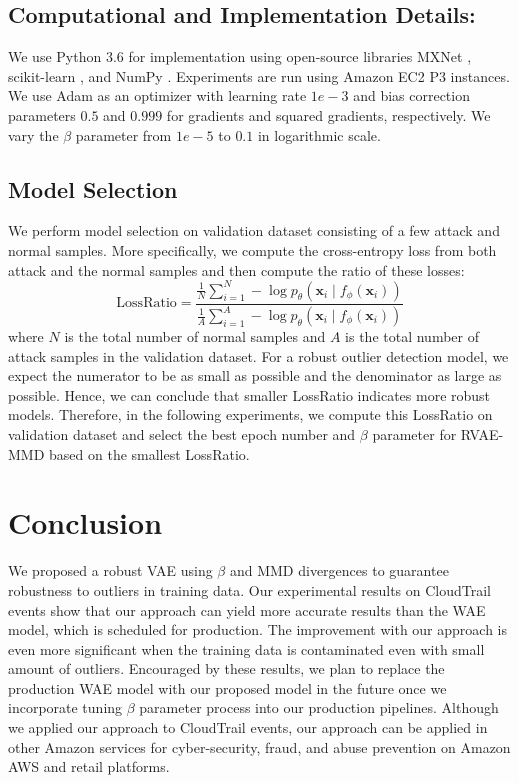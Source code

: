 \documentclass{article}
\def\bx{\mathbf{x}}
\theoremstyle{plain}
\theoremstyle{definition}
\begin{document}
\subsection{Computational and Implementation Details:} 

We use Python 3.6 for implementation \cite{oliphant2007python} using open-source libraries MXNet \cite{mxnet2018flexible}, scikit-learn \cite{pedregosa2011scikit},  and NumPy \cite{walt2011numpy}. Experiments are run using Amazon EC2 P3 instances. We use Adam \cite{kingma2014adam} as an optimizer with learning rate $1e-3$ and bias correction parameters $0.5$ and $0.999$ for gradients and squared gradients, respectively. We vary the $\beta$ parameter from $1 e-5$ to $0.1$ in logarithmic scale.

\subsection{Model Selection}
We perform model selection on validation dataset consisting of a few attack and normal samples. More specifically, we compute the cross-entropy loss from both attack and the normal samples and then compute the ratio of these losses:
\begin{equation}
\mbox{LossRatio} = \frac{\frac{1}{{N}} \sum_{i=1}^N - \log p_{\theta}(\bx_i \mid f_{\phi}(\bx_i)) }{ \frac{1}{{A}}   \sum_{i=1}^A- \log p_{\theta}(\bx_i \mid f_{\phi}(\bx_i)) }
\end{equation}
where $N$ is the total number of normal samples and $A$ is the total number of attack samples in the validation dataset. For a robust outlier detection model, we expect the numerator to be as small as possible and the denominator as large as possible. Hence, we can conclude that smaller LossRatio indicates more robust models. Therefore, in the following experiments, we compute this LossRatio on validation dataset and select the best epoch number and $\beta$ parameter for RVAE-MMD based on the smallest LossRatio.






\section{Conclusion}
We proposed a robust VAE using $\beta$ and MMD divergences to guarantee robustness to outliers in training data. Our experimental results on CloudTrail events show that our approach can yield more accurate results than the WAE model, which is scheduled for production. The improvement with our approach is even more significant when the training data is contaminated even with small amount of outliers. Encouraged by these results, we plan to replace the production WAE model with our proposed model in the future once we incorporate tuning $\beta$ parameter process into our production pipelines. Although we applied our approach to CloudTrail events, our approach can be applied in other Amazon services for cyber-security, fraud, and abuse prevention on Amazon AWS and retail platforms.
\end{document}
